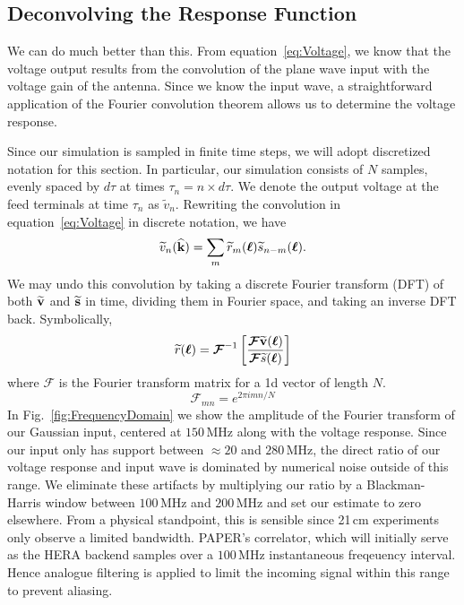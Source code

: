 \documentclass[twocolumn]{emulateapj}
\begin{document}
\subsection{Deconvolving the Response Function}\label{ssec:Deconvolve}

We can do much better than this. From equation~\ref{eq:Voltage}, we know that the voltage output results from the convolution of the plane wave input with the voltage gain of the antenna. Since we know the input wave, a straightforward application of the Fourier convolution theorem allows us to determine the voltage response.

Since our simulation is sampled in finite time steps, we will adopt discretized notation for this section. In particular, our simulation consists of $N$ samples, evenly spaced by $d \tau$ at times $\tau_n = n \times d \tau$. 
We denote the output voltage at the feed terminals at time $\tau_n$ as $\widetilde{v}_n$. Rewriting the convolution in equation~\ref{eq:Voltage} in discrete notation, we have
\begin{equation}
\ftv_n({\bf \widehat{k}}) = \sum_m \ftr_m(\bl) \fts_{n-m}(\bl).
\end{equation}
We may undo this convolution by taking a discrete Fourier transform (DFT) of both ${\bf \widetilde{v}}$ and ${\bf \widetilde{s}}$ in time, dividing them in Fourier space, and taking an inverse DFT back. Symbolically,
\begin{equation}\label{eq:Inversion}
\ftr(\bl) = \boldsymbol{\mathcal{F}}^{-1} \left[ \frac{\boldsymbol{\mathcal{F}} {\bf \widetilde{v}}(\bl)}{\boldsymbol{\mathcal{F}}{\fts}(\bl)} \right] 
\end{equation}
where $\boldsymbol{\mathcal{F}}$ is the Fourier transform matrix for a 1d vector of length $N$. 
\begin{equation}
\boldsymbol{\mathcal{F}}_{mn} = e^{2 \pi i m n /N}
\end{equation}
In Fig.~\ref{fig:FrequencyDomain} we show the amplitude of the Fourier transform of our Gaussian input, centered at $150$\,MHz along with the voltage response. Since our input only has support between $\approx 20$ and $280$\,MHz, the direct ratio of our voltage response and input wave is dominated by numerical noise outside of this range. We eliminate these artifacts by multiplying our ratio by a Blackman-Harris window between $100$\,MHz and $200$\,MHz and set our estimate to zero elsewhere. From a physical standpoint, this is sensible since 21\,cm experiments only observe a limited bandwidth. PAPER's correlator, which will initially serve as the HERA backend samples over a $100$\,MHz instantaneous freqeuency interval. Hence analogue filtering is applied to limit the incoming signal within this range to prevent aliasing.
\end{document}
